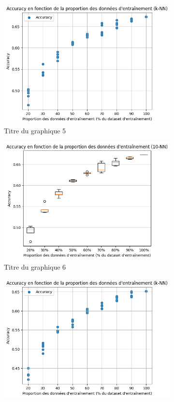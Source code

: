 \documentclass[12pt]{article}
\begin{document}
\begin{figure}[H]
\begin{subfigure}[t]{0.35\textwidth}
        \includegraphics[width=\textwidth]{static/knn_cam_10_raw.png}
        \caption{Titre du graphique 5}
    \end{subfigure}
    \hfill
    \begin{subfigure}[t]{0.35\textwidth}
        \centering
        \includegraphics[width=\textwidth]{static/knn_cam_10.png}
        \caption{Titre du graphique 6}
    \end{subfigure}
    \hfill
    \begin{subfigure}[t]{0.35\textwidth}
        \centering
        \includegraphics[width=\textwidth]{static/knn_cam_15_raw.png}

\end{subfigure}
\end{figure}
\end{document}
